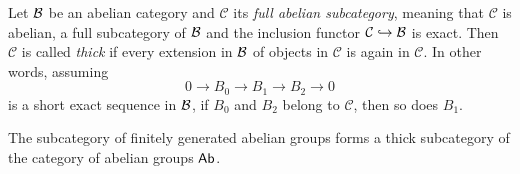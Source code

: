\begin{definition}
    Let $\mathcal B$ be an abelian category and $\mathcal C$ its \emph{full abelian subcategory}, meaning that $\mathcal C$ is abelian, a full subcategory of $\mathcal B$ and the inclusion functor $\mathcal C \hookrightarrow \mathcal B$ is exact. Then $\mathcal C$ is called \emph{thick} if every extension in $\mathcal B$ of objects in $\mathcal C$ is again in $\mathcal C$. In other words, assuming 
    \[
            0 \to B_0 \to B_1 \to B_2 \to 0
    \]
    is a short exact sequence in $\mathcal B$, if $B_0$ and $B_2$ belong to $\mathcal C$, then so does $B_1$.
    

\end{definition}

\begin{example}
    The subcategory of finitely generated abelian groups forms a thick subcategory of the category of abelian groups $\mathsf{Ab}$.
\end{example}

